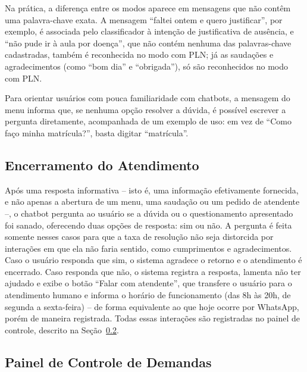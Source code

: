 \documentclass[12pt]{article}
\begin{document}
Na prática, a diferença entre os modos aparece em mensagens que não contêm
uma palavra-chave exata. A mensagem ``faltei ontem e quero justificar'', por
exemplo, é associada pelo classificador à intenção de justificativa de
ausência, e ``não pude ir à aula por doença'', que não contém nenhuma das
palavras-chave cadastradas, também é reconhecida no modo com PLN; já as saudações e agradecimentos (como ``bom dia'' e ``obrigada''), só são
reconhecidos no modo com PLN.

Para orientar usuários com pouca familiaridade com chatbots, a mensagem do
menu informa que, se nenhuma opção resolver a dúvida, é possível escrever
a pergunta diretamente, acompanhada de um exemplo de uso: em vez de ``Como
faço minha matrícula?'', basta digitar ``matrícula''.

\subsection{Encerramento do Atendimento}

Após uma resposta informativa -- isto é, uma informação efetivamente
fornecida, e não apenas a abertura de um menu, uma saudação ou um pedido
de atendente --, o chatbot pergunta ao usuário se a dúvida ou o
questionamento apresentado foi sanado, oferecendo duas opções de resposta:
sim ou não. A pergunta é feita somente nesses casos para que a taxa de
resolução não seja distorcida por interações em que ela não faria sentido,
como cumprimentos e agradecimentos. Caso o usuário responda que sim, o
sistema agradece o retorno e o atendimento é encerrado. Caso responda que
não, o sistema registra a resposta, lamenta não ter ajudado e exibe o
botão ``Falar com atendente'', que transfere o usuário para o atendimento
humano e informa o horário de funcionamento (das 8h às 20h, de segunda a
sexta-feira) -- de forma equivalente ao que hoje ocorre por WhatsApp,
porém de maneira registrada. Todas essas interações são registradas no painel de controle, descrito na Seção~\ref{sec:painel}.

\subsection{Painel de Controle de Demandas}\label{sec:painel}
\end{document}

